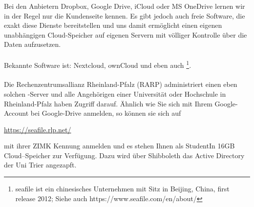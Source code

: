 
\subsubsection{\seafile}
Bei den Anbietern  Dropbox, Google Drive, iCloud oder MS OneDrive lernen wir in der Regel nur die Kundenseite kennen. Es gibt jedoch auch freie Software, die exakt diese Dienste bereitstellen und uns damit ermöglicht einen eigenen unabhängigen Cloud-Speicher auf eigenen Servern mit völliger Kontrolle über die Daten aufzusetzen.\\ 
~\\
Bekannte Software ist: Nextcloud, ownCloud und eben auch  \footnote{seafile ist ein chinesisches Unternehmen mit Sitz in Beijing,
	China, first release 2012; Siehe auch https://www.seafile.com/en/about/}.\\~\\
Die Rechenzentrumsallianz Rheinland-Pfalz (RARP) administriert einen eben solchen \seafile-Server und alle Angehörigen einer Universität oder Hochschule in Rheinland-Pfalz haben Zugriff darauf. Ähnlich wie Sie sich mit Ihrem Google-Account bei Google-Drive anmelden, so können sie sich auf
 			\begin{center}
 	\url{https://seafile.rlp.net/}
 \end{center}
mit ihrer ZIMK Kennung anmelden und es stehen Ihnen als StudentIn 16GB Cloud--Speicher zur Verfügung. Dazu wird über Shibboleth das Active Directory der Uni Trier angezapft.


